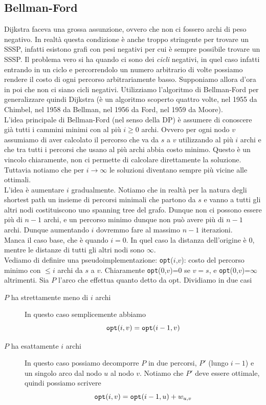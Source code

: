 \documentclass[11pt]{scrartcl}
\begin{document}
	\subsection{Bellman-Ford}
	Dijkstra faceva una grossa assunzione, ovvero che non ci fossero archi di peso negativo. In realtà questa condizione è anche troppo stringente per trovare un SSSP, infatti esistono grafi con pesi negativi per cui è sempre possibile trovare un SSSP. Il problema vero si ha quando ci sono dei \textit{cicli} negativi, in quel caso infatti entrando in un ciclo e percorrendolo un numero arbitrario di volte possiamo rendere il costo di ogni percorso arbitrariamente basso. Supponiamo allora d'ora in poi che non ci siano cicli negativi. Utilizziamo l'algoritmo di Bellman-Ford per generalizzare quindi Dijkstra
	(è un algoritmo scoperto quattro volte, nel 1955 da Chimbel, nel 1958 da Bellman, nel 1956 da Ford, nel 1959 da Moore). \\
	L'idea principale di Bellman-Ford (nel senso della DP) è assumere di conoscere già tutti i cammini minimi con al più $i\ge 0$ archi. Ovvero per ogni nodo $v$ assumiamo di aver calcolato il percorso che va da $s$ a $v$ utilizzando al più $i$ archi e che tra tutti i percorsi che usano al più archi abbia costo minimo. Questo è un vincolo chiaramente, non ci permette di calcolare direttamente la soluzione. Tuttavia notiamo che per $i\to\infty$ le soluzioni diventano sempre più vicine alle ottimali. \\
	L'idea è aumentare $i$ gradualmente. Notiamo che in realtà per la natura degli shortest path un insieme di percorsi minimali che partono da $s$ e vanno a tutti gli altri nodi costituiscono uno spanning tree del grafo. Dunque non ci possono essere più di $n-1$ archi, e un percorso minimo dunque non può avere più di $n-1$ archi. Dunque aumentando $i$ dovremmo fare al massimo $n-1$ iterazioni. \\
	Manca il caso base, che è quando $i=0$. In quel caso la distanza dell'origine è $0$, mentre le distanze di tutti gli altri nodi sono $\infty$. \\
	Vediamo di definire una pseudoimplementazione:
	\verb|opt|($i$,$v$): costo del percorso minimo con $\le i$ archi da $s$ a $v$. Chiaramente \verb|opt|($0$,$v$)=$0$ se $v=s$, e \verb|opt|($0$,$v$)=$\infty$ altrimenti. Sia $P$ l'arco che effettua quanto detto da opt. Dividiamo in due casi
	\begin{description}
		\item[$P$ ha strettamente meno di $i$ archi] In questo caso semplicemente abbiamo
		$$\verb*|opt|(i,v)=\verb*|opt|(i-1,v)$$
		\item[$P$ ha esattamente $i$ archi] In questo caso possiamo decomporre $P$ in due percorsi, $P'$ (lungo $i-1$) e un singolo arco dal nodo $u$ al nodo $v$. Notiamo che $P'$ deve essere ottimale, quindi possiamo scrivere
		$$\verb|opt|(i,v)=\verb*|opt|(i-1,u)+w_{u,v}$$
	\end{description}
\end{document}
